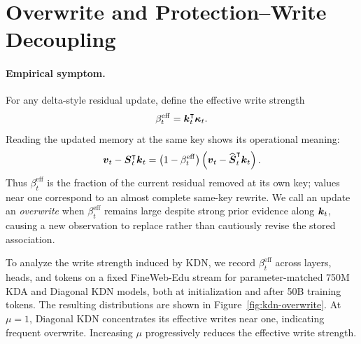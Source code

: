 \documentclass[11pt,letterpaper,logo]{yalearxiv}
\begin{document}
\section{Overwrite and Protection--Write Decoupling}
\label{app:protection-write}

\paragraph{Empirical symptom.}
For any delta-style residual update, define the effective write strength
\begin{equation}
  \beta_t^{\mathrm{eff}}
  =\boldsymbol{k}_t^{\intercal}\boldsymbol{\kappa}_t.
  \label{eq:appendix-effective-write}
\end{equation}
Reading the updated memory at the same key shows its operational meaning:
\begin{equation}
  \boldsymbol{v}_t-\boldsymbol{S}_t^{\intercal}\boldsymbol{k}_t
  =\left(1-\beta_t^{\mathrm{eff}}\right)
   \left(\boldsymbol{v}_t-\widehat{\boldsymbol{S}}_t^{\intercal}\boldsymbol{k}_t\right).
  \label{eq:appendix-effective-write-residual}
\end{equation}
Thus $\beta_t^{\mathrm{eff}}$ is the fraction of the current residual removed at its own key;
values near one correspond to an almost complete same-key rewrite. We call an update an
\emph{overwrite} when $\beta_t^{\mathrm{eff}}$ remains large despite strong prior evidence along
$\boldsymbol{k}_t$, causing a new observation to replace rather than cautiously revise the stored
association.

To analyze the write strength induced by KDN, we record $\beta_t^{\mathrm{eff}}$ across layers,
heads, and tokens on a fixed FineWeb-Edu stream for parameter-matched 750M KDA and Diagonal KDN
models, both at initialization and after 50B training tokens. The resulting distributions are shown
in Figure~\ref{fig:kdn-overwrite}. At $\mu=1$, Diagonal KDN concentrates its effective writes near
one, indicating frequent overwrite. Increasing $\mu$ progressively reduces the effective write
strength.
\end{document}
